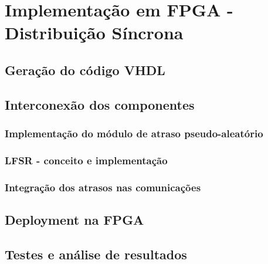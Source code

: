 \section{Implementação em FPGA - Distribuição Síncrona}

\subsection{Geração do código VHDL}

\subsection{Interconexão dos componentes}

\subsubsection{Implementação do módulo de atraso pseudo-aleatório}
\subsubsection{LFSR - conceito e implementação}
\subsubsection{Integração dos atrasos nas comunicações}

\subsection{Deployment na FPGA}

\subsection{Testes e análise de resultados}
